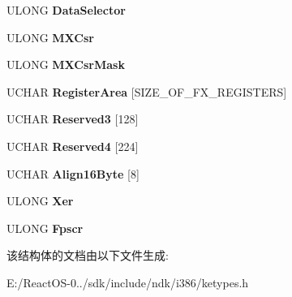 \begin{DoxyCompactItemize}
U\+L\+O\+NG {\bfseries Data\+Selector}
\item 
\mbox{\label{struct___f_x_s_a_v_e___f_o_r_m_a_t_a71bc6fa50808b8104f2b901bcb232427}} 
U\+L\+O\+NG {\bfseries M\+X\+Csr}
\item 
\mbox{\label{struct___f_x_s_a_v_e___f_o_r_m_a_t_aa60ba90aa9a16bb2238e8276ca810205}} 
U\+L\+O\+NG {\bfseries M\+X\+Csr\+Mask}
\item 
\mbox{\label{struct___f_x_s_a_v_e___f_o_r_m_a_t_a0a16c162af4abf384ba7c731c4b21a48}} 
U\+C\+H\+AR {\bfseries Register\+Area} \mbox{[}S\+I\+Z\+E\+\_\+\+O\+F\+\_\+\+F\+X\+\_\+\+R\+E\+G\+I\+S\+T\+E\+RS\mbox{]}
\item 
\mbox{\label{struct___f_x_s_a_v_e___f_o_r_m_a_t_a810e464723d75d97423e108b3e5ade5c}} 
U\+C\+H\+AR {\bfseries Reserved3} \mbox{[}128\mbox{]}
\item 
\mbox{\label{struct___f_x_s_a_v_e___f_o_r_m_a_t_a32f6be27a69edc449754a67c0846ecc4}} 
U\+C\+H\+AR {\bfseries Reserved4} \mbox{[}224\mbox{]}
\item 
\mbox{\label{struct___f_x_s_a_v_e___f_o_r_m_a_t_ad5b7ef93b068fd57fe1b283546251c4e}} 
U\+C\+H\+AR {\bfseries Align16\+Byte} \mbox{[}8\mbox{]}
\item 
\mbox{\label{struct___f_x_s_a_v_e___f_o_r_m_a_t_a4b6cad8f165ee43514399f4f539c8dc0}} 
U\+L\+O\+NG {\bfseries Xer}
\item 
\mbox{\label{struct___f_x_s_a_v_e___f_o_r_m_a_t_abf270acdaa6b9bc77c0ca2eea9f2f850}} 
U\+L\+O\+NG {\bfseries Fpscr}
\end{DoxyCompactItemize}


该结构体的文档由以下文件生成\+:\begin{DoxyCompactItemize}
\item 
E\+:/\+React\+O\+S-\/0../sdk/include/ndk/i386/ketypes.\+h\end{DoxyCompactItemize}
